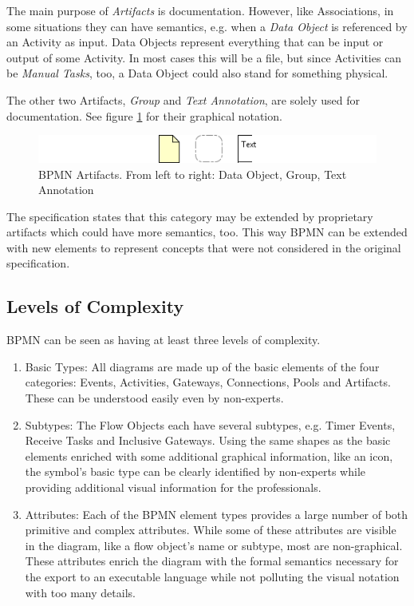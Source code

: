 The main purpose of \emph{Artifacts} is documentation. However, like Associations, in some situations they can have semantics, e.g. when a \emph{Data Object} is referenced by an Activity as input. Data Objects represent everything that can be input or output of some Activity. In most cases this will be a file, but since Activities can be \emph{Manual Tasks}, too, a Data Object could also stand for something physical.

The other two Artifacts, \emph{Group} and \emph{Text Annotation}, are solely used for documentation. See figure \ref{fig:artifacts} for their graphical notation.

\begin{figure}[htp]
	\centering
	\includegraphics[width=.75\textwidth]{figures/bpmn/artifacts.png}
	\caption[BPMN Artifacts]{BPMN Artifacts. From left to right: Data Object, Group, Text Annotation}
	\label{fig:artifacts}
\end{figure}

The specification states that this category may be extended by proprietary artifacts which could have more semantics, too. This way BPMN can be extended with new elements to represent concepts that were not considered in the original specification.


\subsection{Levels of Complexity}

BPMN can be seen as having at least three levels of complexity.

\begin{enumerate}
	\item Basic Types: All diagrams are made up of the basic elements of the four categories: Events, Activities, Gateways, Connections, Pools and Artifacts. These can be understood easily even by non-experts.
	\item Subtypes: The Flow Objects each have several subtypes, e.g. Timer Events, Receive Tasks and Inclusive Gateways. Using the same shapes as the basic elements enriched with some additional graphical information, like an icon, the symbol's basic type can be clearly identified by non-experts while providing additional visual information for the professionals.
	\item Attributes: Each of the BPMN element types provides a large number of both primitive and complex attributes. While some of these attributes are visible in the diagram, like a flow object's name or subtype, most are non-graphical. These attributes enrich the diagram with the formal semantics necessary for the export to an executable language while not polluting the visual notation with too many details.
\end{enumerate}

